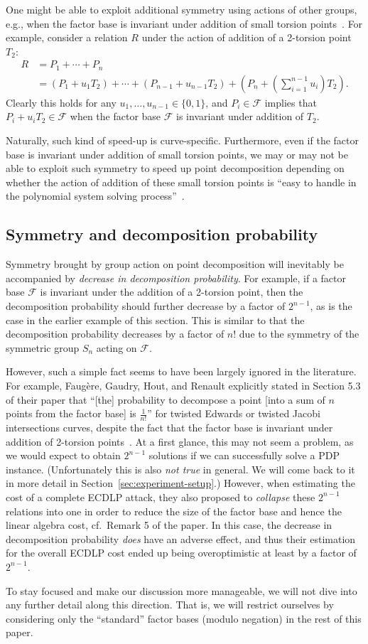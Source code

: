 One might be able to exploit additional symmetry using actions of
other groups, e.g., when the factor base is invariant under addition
of small torsion points~\cite{DBLP:journals/joc/FaugereGHR14}.
%
For example, consider a relation $R$ under the action of addition of a
2-torsion point $T_2$:
\begin{align*}
  R & = P_1+\cdots+P_n \\
    & =
      (P_1+u_1T_2)+\cdots+(P_{n-1}+u_{n-1}T_2)+\left(P_n+\left(\sum_{i=1}^{n-1}u_i\right)T_2\right).
\end{align*}
%
Clearly this holds for any $u_1,\ldots,u_{n-1}\in\{0,1\}$, and
$P_i\in\mathcal F$ implies that $P_i+u_iT_2\in\mathcal F$ when the
factor base $\mathcal F$ is invariant under addition of $T_2$.

Naturally, such kind of speed-up is curve-specific.
%
Furthermore, even if the factor base is invariant under addition of
small torsion points, we may or may not be able to exploit such
symmetry to speed up point decomposition depending on whether the
action of addition of these small torsion points is ``easy to handle
in the polynomial system solving
process''~\cite{DBLP:journals/joc/FaugereGHR14}.

\subsection{Symmetry and decomposition probability}
\label{sec:symmetry-decomposition-probability}

Symmetry brought by group action on point decomposition will
inevitably be accompanied by \emph{decrease in decomposition
  probability}.
%
For example, if a factor base $\mathcal F$ is invariant under the
addition of a 2-torsion point, then the decomposition probability
should further decrease by a factor of $2^{n-1}$, as is the case in
the earlier example of this section.
%
This is similar to that the decomposition probability decreases by a
factor of $n!$ due to the symmetry of the symmetric group $S_n$ acting
on $\mathcal F$.

However, such a simple fact seems to have been largely ignored in the
literature.
%
For example, Faug\`ere, Gaudry, Hout, and Renault explicitly stated in
Section 5.3 of their paper that ``[the] probability to decompose a
point [into a sum of $n$ points from the factor base] is
$\frac{1}{n!}$'' for twisted Edwards or twisted Jacobi intersections
curves, despite the fact that the factor base is invariant under
addition of 2-torsion points~\cite{DBLP:journals/joc/FaugereGHR14}.
%
At a first glance, this may not seem a problem, as we would expect to
obtain $2^{n-1}$ solutions if we can successfully solve a PDP
instance.
%
(Unfortunately this is also \emph{not true} in general.  We will come
back to it in more detail in Section~\ref{sec:experiment-setup}.)
% 
However, when estimating the cost of a complete ECDLP attack, they
also proposed to \emph{collapse} these $2^{n-1}$ relations into one in
order to reduce the size of the factor base and hence the linear
algebra cost, cf.~Remark 5 of the paper.
%
In this case, the decrease in decomposition probability \emph{does}
have an adverse effect, and thus their estimation for the overall
ECDLP cost ended up being overoptimistic at least by a factor of
$2^{n-1}$.

To stay focused and make our discussion more manageable, we will not
dive into any further detail along this direction.
%
That is, we will restrict ourselves by considering only the
``standard'' factor bases (modulo negation) in the rest of this paper.

